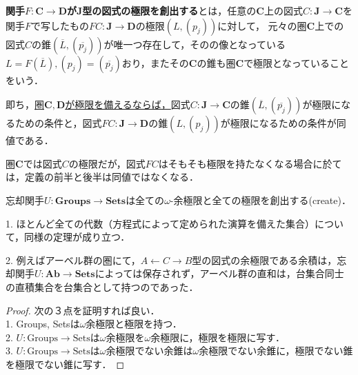 \documentclass[uplatex, dvipdfmx]{jsarticle}
\begin{document}
\begin{definition}
    \textbf{関手$F:\mathbf{C\to D}$が$\mathbf{J}$型の図式の極限を創出する}とは，任意の$\mathbf{C}$上の図式$C:\mathbf{J\to C}$を関手$F$で写したもの$FC:\mathbf{J\to D}$の極限$(L,(p_j))$に対して，
    元々の圏$\mathbf{C}$上での図式$C$の錐$(\overline{L},(\overline{p_j}))$が唯一つ存在して，そのの像となっている$L=F(\overline{L}), (p_j)=(\overline{p_j})$おり，またその$\mathbf{C}$の錐も圏$\mathbf{C}$で極限となっていることをいう．

    即ち，\underline{圏$\mathbf{C,D}$が極限を備えるならば，}図式$C:\mathbf{J\to C}$の錐$(\overline{L},(\overline{p_j}))$が極限になるための条件と，図式$FC:\mathbf{J\to D}$の錐$(L,(p_j))$が極限になるための条件が同値である．
\end{definition}
\begin{remark*}
    圏$\mathbf{C}$では図式$C$の極限だが，図式$FC$はそもそも極限を持たなくなる場合に於ては，定義の前半と後半は同値ではなくなる．
\end{remark*}
\begin{proposition}
    忘却関手$U:\mathbf{Groups\to Sets}$は全ての$\omega$-余極限と全ての極限を創出する(create)．
\end{proposition}
\begin{remark*}
    1. ほとんど全ての代数（方程式によって定められた演算を備えた集合）について，同様の定理が成り立つ．

    2. 例えばアーベル群の圏にて，$A\leftarrow C\rightarrow B$型の図式の余極限である余積は，忘却関手$U:\mathbf{Ab\to Sets}$によっては保存されず，アーベル群の直和は，台集合同士の直積集合を台集合として持つのであった．
\end{remark*}
\begin{proof}
    次の３点を証明すれば良い．\\ 1. Groups, Setsは$\omega$余極限と極限を持つ．\\2. $U:\mathrm{Groups\to Sets}$は$\omega$余極限を$\omega$余極限に，極限を極限に写す．\\3. $U:\mathrm{Groups\to Sets}$は$\omega$余極限でない余錐は$\omega$余極限でない余錐に，極限でない錐を極限でない錐に写す．
\end{proof}
\end{document}
